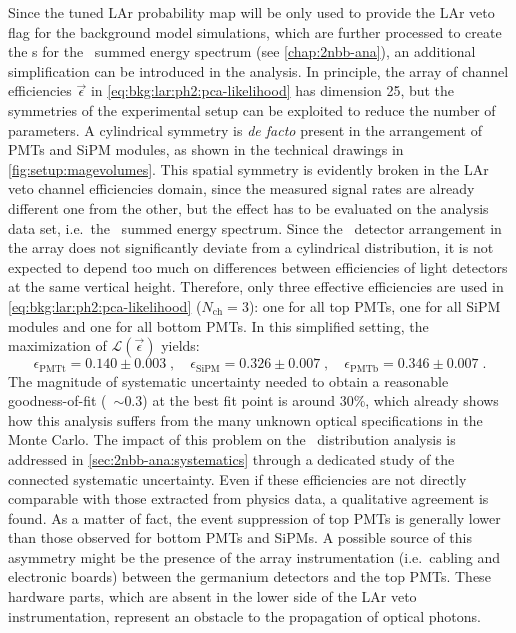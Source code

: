 Since the tuned LAr probability map will be only used to provide the LAr veto flag for the
background model simulations, which are further processed to create the \pdf{}s for the
\bege\ summed energy spectrum (see \cref{chap:2nbb-ana}), an additional simplification can be
introduced in the analysis. In principle, the array of channel efficiencies
$\vec{\epsilon}$ in \cref{eq:bkg:lar:ph2:pca-likelihood} has dimension 25, but the
symmetries of the experimental setup can be exploited to reduce the number of parameters.
A cylindrical symmetry is \emph{de facto} present in the arrangement of PMTs and SiPM
modules, as shown in the technical drawings in \cref{fig:setup:magevolumes}. This spatial
symmetry is evidently broken in the LAr veto channel efficiencies domain, since the
measured signal rates are already different one from the other, but the effect has to be
evaluated on the analysis data set, i.e.~the \bege\ summed energy spectrum. Since the
\bege\ detector arrangement in the array does not significantly deviate from a cylindrical
distribution, it is not expected to depend too much on differences between efficiencies of
light detectors at the same vertical height. Therefore, only three effective efficiencies
are used in \cref{eq:bkg:lar:ph2:pca-likelihood} ($N_\text{ch}=3$): one for all top PMTs,
one for all SiPM modules and one for all bottom PMTs.  In this simplified setting, the
maximization of $\mathcal{L}(\vec{\epsilon})$ yields:
\begin{equation}\label{eq:bkg:lar:ph2:chan-eff}
  \epsilon_\text{PMTt} = 0.140 \pm 0.003 \;, \quad
  \epsilon_\text{SiPM} = 0.326 \pm 0.007 \;, \quad
  \epsilon_\text{PMTb} = 0.346 \pm 0.007 \;.
\end{equation}
The magnitude of systematic uncertainty needed to obtain a reasonable goodness-of-fit
(\pvalue~$\sim 0.3$) at the best fit point is around 30\%, which already shows how this
analysis suffers from the many unknown optical specifications in the Monte Carlo.  The
impact of this problem on the \nnbb\ distribution analysis is addressed in
\cref{sec:2nbb-ana:systematics} through a dedicated study of the connected systematic
uncertainty. Even if these efficiencies are not directly comparable with those extracted
from physics data, a qualitative agreement is found. As a matter of fact, the event
suppression of top PMTs is generally lower than those observed for bottom PMTs and SiPMs.
A possible source of this asymmetry might be the presence of the array instrumentation
(i.e.~cabling and electronic boards) between the germanium detectors and the top PMTs.
These hardware parts, which are absent in the lower side of the LAr veto instrumentation,
represent an obstacle to the propagation of optical photons.

